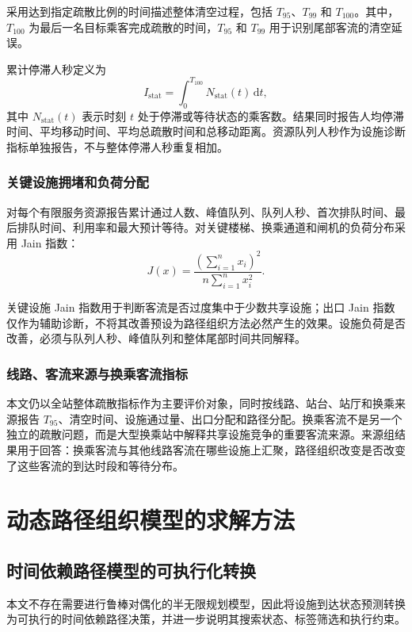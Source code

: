\documentclass[UTF8,a4paper,12pt]{ctexart}
\begin{document}
采用达到指定疏散比例的时间描述整体清空过程，包括 \(T_{95}\)、\(T_{99}\) 和 \(T_{100}\)。其中，\(T_{100}\) 为最后一名目标乘客完成疏散的时间，\(T_{95}\) 和 \(T_{99}\) 用于识别尾部客流的清空延误。

累计停滞人秒定义为
\[
I_{\mathrm{stat}}=\int_{0}^{T_{100}}N_{\mathrm{stat}}(t)\,\mathrm{d}t,
\]
其中 \(N_{\mathrm{stat}}(t)\) 表示时刻 \(t\) 处于停滞或等待状态的乘客数。结果同时报告人均停滞时间、平均移动时间、平均总疏散时间和总移动距离。资源队列人秒作为设施诊断指标单独报告，不与整体停滞人秒重复相加。

\subsubsection{关键设施拥堵和负荷分配}

对每个有限服务资源报告累计通过人数、峰值队列、队列人秒、首次排队时间、最后排队时间、利用率和最大预计等待。对关键楼梯、换乘通道和闸机的负荷分布采用 Jain 指数：
\[
J(x)=\frac{(\sum_{i=1}^{n}x_i)^2}{n\sum_{i=1}^{n}x_i^2}.
\]

关键设施 Jain 指数用于判断客流是否过度集中于少数共享设施；出口 Jain 指数仅作为辅助诊断，不将其改善预设为路径组织方法必然产生的效果。设施负荷是否改善，必须与队列人秒、峰值队列和整体尾部时间共同解释。

\subsubsection{线路、客流来源与换乘客流指标}

本文仍以全站整体疏散指标作为主要评价对象，同时按线路、站台、站厅和换乘来源报告 \(T_{95}\)、清空时间、设施通过量、出口分配和路径分配。换乘客流不是另一个独立的疏散问题，而是大型换乘站中解释共享设施竞争的重要客流来源。来源组结果用于回答：换乘客流与其他线路客流在哪些设施上汇聚，路径组织改变是否改变了这些客流的到达时段和等待分布。

\section{动态路径组织模型的求解方法}

\subsection{时间依赖路径模型的可执行化转换}

本文不存在需要进行鲁棒对偶化的半无限规划模型，因此将设施到达状态预测转换为可执行的时间依赖路径决策，并进一步说明其搜索状态、标签筛选和执行约束。
\end{document}
